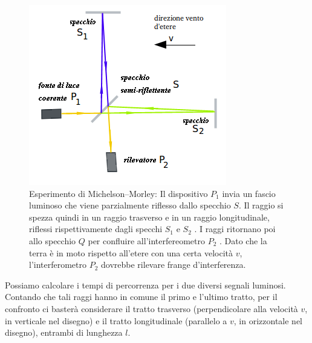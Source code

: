\begin{figure}[htbp]
\centering
\includegraphics[scale=0.7]{immagini/michelson/Interferometro-Michelson}
\caption{\label{esperimentoMichelsonMorley}Esperimento di Michelson--Morley: Il dispositivo $P_1$ invia un fascio luminoso 
che viene parzialmente riflesso dallo specchio $S$.
Il raggio si spezza quindi in un raggio trasverso e in
un raggio longitudinale, riflessi rispettivamente dagli specchi $S_1$ e $S_2$ . I raggi
ritornano poi allo specchio $Q$ per confluire all'interfereometro $P_2$ . Dato che la
terra è in moto rispetto all'etere con una certa velocità $v$, l'interferometro $P_2$
dovrebbe rilevare frange d'interferenza.}
\end{figure}

Possiamo calcolare i tempi di percorrenza per i due diversi segnali luminosi. 
Contando che tali raggi hanno in comune il primo e l'ultimo tratto,
per il confronto ci basterà considerare il tratto trasverso (perpendicolare alla
velocità $v$, in verticale nel disegno) e il tratto longitudinale (parallelo a $v$, in
orizzontale nel disegno), entrambi di lunghezza $l$.


